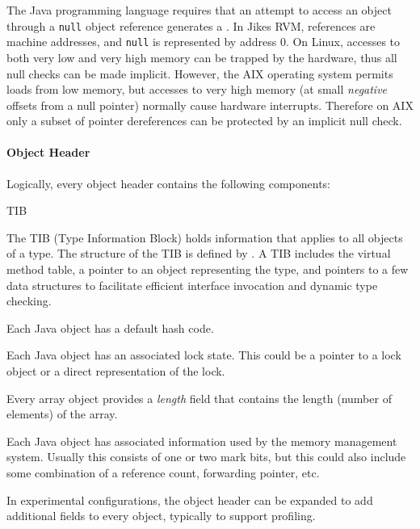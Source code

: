 The Java programming language requires that an attempt to access an
object through a {\tt null} object reference generates a
.  In Jikes RVM, references are
machine addresses, and {\tt null} is represented by address $0$.  
On Linux, accesses to both very low and very high memory can be
trapped by the hardware, thus all null checks can be made implicit.
However, the AIX\TMweb{} operating system permits loads from low
memory, but accesses to very high memory (at small {\em negative}
offsets from a null pointer) normally cause hardware 
interrupts. Therefore on AIX only a subset of pointer dereferences can
be protected by an implicit null check. 

\paragraph{Object Header}
Logically, every object header contains the following components:
\begin{description}
%
%
%
%
%
%
%
\begin{Label}{TIB}
\item[TIB Pointer] The TIB (Type Information Block) holds information that
applies to all objects of a type.  The structure of the TIB is defined by 
.
A TIB includes the virtual method table, a pointer to an object
representing the type, and pointers to a few data structures to
facilitate efficient interface invocation and dynamic type checking.
\end{Label}
%
\item[Default Hash Code] Each Java object has a default hash code.
%
\item[Lock] Each Java object has an associated lock state.  This could be a
pointer to a lock object or a direct representation of the lock.
%
\item[Array Length] Every array object provides a {\em length} field
that contains the length (number of elements) of the array.
%
\item[Garbage Collection Information] Each Java object has associated
information used by the memory management system.  Usually this consists of one
or two mark bits, but this could also include some combination of a reference
count, forwarding pointer, etc.
%
\item[Misc Fields] In experimental configurations, the object header
can be expanded to add additional fields to every object, typically to
support profiling. 
\end{description}

